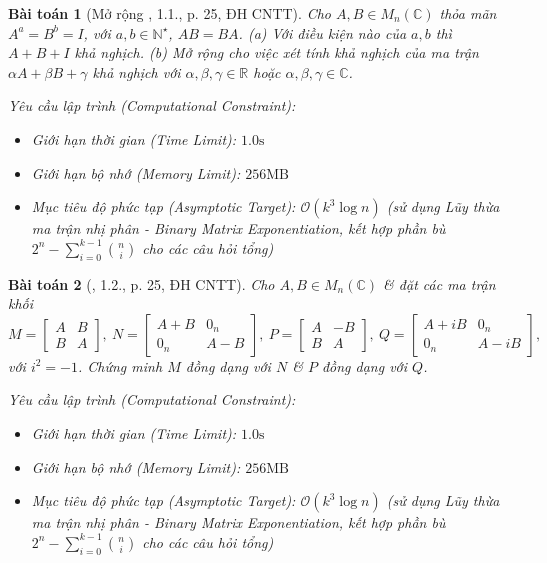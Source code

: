 \documentclass{article}
\newtheorem{baitoan}{Bài toán}
\begin{document}
\begin{baitoan}[Mở rộng \cite{VMS_VMC2024}, 1.1., p. 25, ĐH CNTT]
	Cho $A,B\in M_n(\mathbb{C})$ thỏa mãn $A^a = B^b = I$, với $a,b\in\mathbb{N}^\star$, $AB = BA$. (a) Với điều kiện nào của $a,b$ thì $A + B + I$ khả nghịch. (b) Mở rộng cho việc xét tính khả nghịch của ma trận $\alpha A + \beta B + \gamma$ khả nghịch với $\alpha,\beta,\gamma\in\mathbb{R}$ hoặc $\alpha,\beta,\gamma\in\mathbb{C}$.

    \vspace{0.5em}
    \emph{Yêu cầu lập trình (Computational Constraint):}
    \begin{itemize}
        \item Giới hạn thời gian (Time Limit): $1.0\mathrm{s}$
        \item Giới hạn bộ nhớ (Memory Limit): $256\mathrm{MB}$
        \item Mục tiêu độ phức tạp (Asymptotic Target): $\mathcal{O}(k^3 \log n)$ (sử dụng Lũy thừa ma trận nhị phân - Binary Matrix Exponentiation, kết hợp phần bù $2^n - \sum_{i=0}^{k-1} \binom{n}{i}$ cho các câu hỏi tổng)
    \end{itemize}
\end{baitoan}


\begin{baitoan}[\cite{VMS_VMC2024}, 1.2., p. 25, ĐH CNTT]
	Cho $A,B\in M_n(\mathbb{C})$ \& đặt các ma trận khối
	\begin{equation*}
		M = \begin{bmatrix}
			A & B\\B & A
		\end{bmatrix},\ N = \begin{bmatrix}
			A + B & 0_n\\0_n & A - B
		\end{bmatrix},\ P = \begin{bmatrix}
			A & -B\\B & A
		\end{bmatrix},\ Q = \begin{bmatrix}
			A + iB & 0_n\\0_n & A - iB
		\end{bmatrix},
	\end{equation*}
	với $i^2 = -1$. Chứng minh $M$ đồng dạng với $N$ \& $P$ đồng dạng với $Q$.

    \vspace{0.5em}
    \emph{Yêu cầu lập trình (Computational Constraint):}
    \begin{itemize}
        \item Giới hạn thời gian (Time Limit): $1.0\mathrm{s}$
        \item Giới hạn bộ nhớ (Memory Limit): $256\mathrm{MB}$
        \item Mục tiêu độ phức tạp (Asymptotic Target): $\mathcal{O}(k^3 \log n)$ (sử dụng Lũy thừa ma trận nhị phân - Binary Matrix Exponentiation, kết hợp phần bù $2^n - \sum_{i=0}^{k-1} \binom{n}{i}$ cho các câu hỏi tổng)
    \end{itemize}
\end{baitoan}
\end{document}
